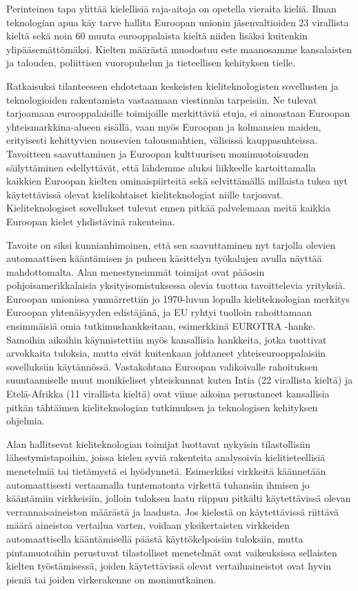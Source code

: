 \documentclass{../../metanetpaper}
\begin{document}
\begin{Parallel}[c]{79mm}{78mm}
{Perinteinen tapa ylittää kielellisiä raja-aitoja on opetella vieraita
kieliä. Ilman teknologian apua käy tarve hallita Euroopan unionin
jäsenvaltioiden 23 virallista kieltä sekä noin 60 muuta eurooppalaista
kieltä niiden lisäksi kuitenkin ylipääsemättömäksi. Kielten määrästä
muodostuu este maanosamme kansalaisten ja talouden, poliittisen
vuoropuhelun ja tieteellisen kehityksen tielle.

Ratkaisuksi tilanteeseen ehdotetaan keskeisten kieliteknologisten
sovellusten ja teknologioiden rakentamista vastaamaan viestinnän
tarpeisiin. Ne tulevat tarjoamaan eurooppalaisille toimijoille
merkittäviä etuja, ei ainoastaan Euroopan yhteismarkkina-alueen
sisällä, vaan myös Euroopan ja kolmansien maiden, erityisesti
kehittyvien nousevien talousmahtien, välisissä
kauppasuhteissa. Tavoitteen saavuttaminen ja Euroopan kulttuurisen
monimuotoisuuden säilyttäminen edellyttävät, että lähdemme aluksi
liikkeelle kartoittamalla kaikkien Euroopan kielten ominaispiirteitä
sekä selvittämällä millaista tukea nyt käytettävissä olevat
kielikohtaiset kieliteknologiat niille tarjoavat. Kieliteknologiset
sovellukset tulevat ennen pitkää palvelemaan meitä kaikkia Euroopan 
kielet yhdistävinä rakenteina.


Tavoite on siksi kunnianhimoinen, että sen saavuttaminen nyt tarjolla olevien
automaattisen kääntämisen ja puheen käsittelyn työkalujen avulla näyttää
mahdottomalta. Alan menestyneimmät toimijat ovat pääosin pohjoisamerikkalaisia
yksityisomistuksessa olevia tuottoa tavoittelevia yrityksiä. Euroopan unionissa
ymmärrettiin jo 1970-luvun lopulla kieliteknologian merkitys Euroopan
yhtenäisyyden edistäjänä, ja EU ryhtyi tuolloin rahoittamaan ensimmäisiä omia
tutkimushankkeitaan, esimerkkinä EUROTRA -hanke. Samoihin aikoihin
käynnistettiin myös kansallisia hankkeita, jotka tuottivat arvokkaita tuloksia,
mutta eivät kuitenkaan johtaneet yhteiseurooppalaisiin sovelluksiin
käytännössä. Vastakohtana Euroopan valikoivalle rahoituksen suuntaamiselle muut
monikieliset yhteiskunnat kuten Intia (22 virallista kieltä) ja Etelä-Afrikka
(11 virallista kieltä) ovat viime aikoina perustaneet kansallisia pitkän
tähtäimen kieliteknologian tutkimuksen ja teknologisen kehityksen ohjelmia.

Alan hallitsevat kieliteknologian toimijat luottavat nykyisin tilastollisiin
lähestymistapoihin, joissa kielen syviä rakenteita analysoivia
kielitieteellisiä menetelmiä tai tietämystä ei hyödynnetä. Esimerkiksi
virkkeitä käännetään automaattisesti vertaamalla tuntematonta virkettä
tuhansiin ihmisen jo kääntämiin virkkeisiin, jolloin tuloksen laatu riippuu
pitkälti käytettävissä olevan verrannaisaineiston määrästä ja laadusta. Jos
kielestä on käytettävissä riittävä määrä aineistoa vertailua varten, voidaan
yksikertaisten virkkeiden automaattisella kääntämisellä päästä käyttökelpoisiin
tuloksiin, mutta pintamuotoihin perustuvat tilastolliset menetelmät ovat
vaikeuksissa sellaisten kielten työstämisessä, joiden käytettävissä olevat
vertailuaineistot ovat hyvin pieniä tai joiden virkerakenne on monimutkainen.

}
\end{Parallel}
\end{document}
